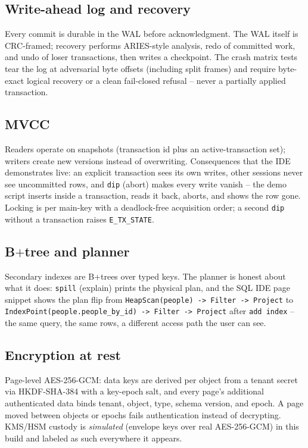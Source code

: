 \documentclass[11pt]{article}
\newcommand{\seamql}{\lstinline[language=SEAMQL]}
\newcommand{\code}[1]{\texttt{#1}}
\begin{document}
\subsection{Write-ahead log and recovery}
Every commit is durable in the WAL before acknowledgment. The WAL itself is
CRC-framed; recovery performs ARIES-style analysis, redo of committed work,
and undo of loser transactions, then writes a checkpoint. The crash matrix
tests tear the log at adversarial byte offsets (including split frames) and
require byte-exact logical recovery or a clean fail-closed refusal --
never a partially applied transaction.

\subsection{MVCC}
Readers operate on snapshots (transaction id plus an active-transaction set);
writers create new versions instead of overwriting. Consequences that the
IDE demonstrates live: an explicit transaction sees its own writes, other
sessions never see uncommitted rows, and \seamql{dip} (abort) makes every
write vanish -- the demo script inserts inside a transaction, reads it back,
aborts, and shows the row gone. Locking is per main-key with a deadlock-free
acquisition order; a second \seamql{dip} without a transaction raises
\code{E\_TX\_STATE}.

\subsection{B$+$tree and planner}
Secondary indexes are B$+$trees over typed keys. The planner is honest about
what it does: \seamql{spill} (explain) prints the physical plan, and the
SQL IDE page snippet shows the plan flip from
\code{HeapScan(people) -> Filter -> Project} to
\code{IndexPoint(people.people\_by\_id) -> Filter -> Project} after
\seamql{add index} -- the same query, the same rows, a different access path
the user can see.

\subsection{Encryption at rest}
Page-level AES-256-GCM: data keys are derived per object from a tenant
secret via HKDF-SHA-384 with a key-epoch salt, and every page's additional
authenticated data binds tenant, object, type, schema version, and epoch.
A page moved between objects or epochs fails authentication instead of
decrypting. KMS/HSM custody is \emph{simulated} (envelope keys over real
AES-256-GCM) in this build and labeled as such everywhere it appears.
\end{document}
